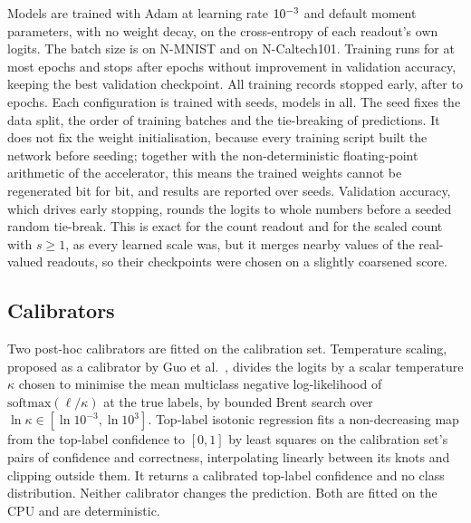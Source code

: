 \documentclass[10pt]{article}
\begin{document}
Models are trained with Adam at learning rate $10^{-3}$ and default moment parameters, with %
no weight decay, on the cross-entropy of each readout's own logits. The batch size is
\batchSize{} on N-MNIST and \batchSizeNc{} on N-Caltech101. Training runs for at most \epochCap{} %
epochs and stops after \patienceEpochs{} epochs without improvement in validation accuracy, %
keeping the best validation checkpoint. All \recordsAll{} training records stopped early, after %
\epochsAllMin{} to \epochsAllMax{} epochs. Each configuration is trained with \nSeeds{} seeds, %
\modelsTotal{} models in all. The seed fixes the data split, the order of training batches and %
the tie-breaking of predictions. It does not fix the weight initialisation, because every
training script built the network before seeding; together with the non-deterministic
floating-point arithmetic of the accelerator, this means the trained weights cannot be
regenerated bit for bit, and results are reported over seeds. Validation accuracy, which drives
early stopping, rounds the logits to whole numbers before a seeded random tie-break. This is
exact for the count readout and for the scaled count with $s\ge1$, as every learned scale was,
but it merges nearby values of the real-valued readouts, so their checkpoints were chosen on a
slightly coarsened score.

\subsection{Calibrators}
\label{sec:calibratordefs}

Two post-hoc calibrators are fitted on the calibration set. Temperature scaling, proposed as a
calibrator by Guo et al.~\citep{guo2017calibration}, divides the logits by a scalar temperature %
$\kappa$ chosen to minimise the mean multiclass negative log-likelihood of
$\mathrm{softmax}(\ell/\kappa)$ at the true labels, by bounded Brent search over
$\ln \kappa\in[\ln 10^{-3},\ln 10^{3}]$. Top-label isotonic %
regression fits a non-decreasing map from the top-label confidence to $[0,1]$ by least squares %
on the calibration set's pairs of confidence and correctness, interpolating linearly between its
knots and clipping outside them. It returns a calibrated top-label confidence and no class
distribution. Neither calibrator changes the prediction. Both are fitted on the CPU and are
deterministic.
\end{document}
